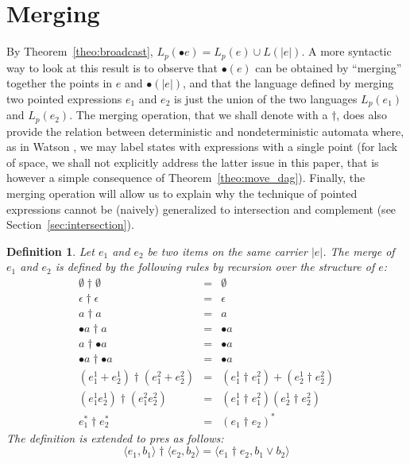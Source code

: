 \documentclass[preprint]{sigplanconf}
\newcommand{\Le}[1]{L(#1)}
\newcommand{\Lp}[1]{L_p(#1)}
\newcounter{item}
\newtheorem{definition}[item]{Definition}
\begin{document}
\section{Merging}\label{merging}
By Theorem~\ref{theo:broadcast}, $\Lp{\bullet e} = \Lp e \cup \Le{|e|}$.
A more syntactic way to look at this result is to observe that 
$\bullet(e)$ can be obtained by ``merging'' together the points in $e$ and 
$\bullet (|e|)$, and that the language defined by merging two pointed
expressions $e_1$ and $e_2$ is just the union of the two languages 
$\Lp{e_1}$ and $\Lp{e_2}$. The merging operation, that we shall denote
with a $\dagger$, does also provide the relation between deterministic 
and nondeterministic automata where, as in Watson \cite{Watson01, Watson02}, 
we may label states with expressions with a single point (for lack of space,
we shall not explicitly address the latter issue in this paper, that 
is however a simple consequence of Theorem~\ref{theo:move_dag}).
Finally, the merging operation will allow us to explain why the
technique of pointed expressions cannot be (naively) generalized 
to intersection and complement (see Section~\ref{sec:intersection}).



\begin{definition}
Let $e_1$ and $e_2$ be two items on the same carrier $|e|$. The merge of $e_1$
and $e_2$ is defined by the following rules by recursion over the structure of
$e$:
\[
\begin{array}{rcl}
\emptyset \dagger \emptyset & = & \emptyset \\
\epsilon \dagger \epsilon & = & \epsilon \\
a \dagger a & = & a \\
\bullet a \dagger a & = & \bullet a \\
a \dagger \bullet a & = & \bullet a \\
\bullet a \dagger \bullet a & = & \bullet a \\
(e^1_1 + e^1_2) \dagger (e^2_1 + e^2_2) & = & (e^1_1 \dagger e^2_1) + (e^1_2 \dagger e^2_2) \\
(e^1_1e^1_2) \dagger (e^2_1e^2_2) & = & (e^1_1 \dagger e^2_1)(e^1_2 \dagger e^2_2) \\
e_1^* \dagger e_2^* & = & (e_1 \dagger e_2)^*
\end{array}
\]
The definition is extended to pres as follows:
$$\langle e_1,b_1 \rangle \dagger \langle e_2,b_2 \rangle = \langle e_1 \dagger e_2, b_1 \vee b_2 \rangle$$
\end{definition}
\end{document}
